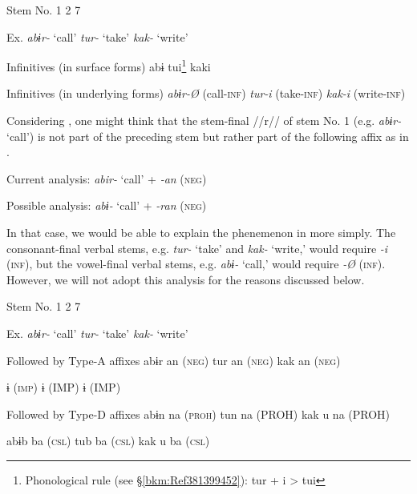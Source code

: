 \begin{table}
\caption{\label{tab:key:66}Infinitives of the verbal stems No. 1, 2, and 7}

Stem No.  1    2    7

Ex.  \textit{abɨr-} ‘call’    \textit{tur-} ‘take’    \textit{kak-} ‘write’

Infinitives (in surface forms)  abɨ      tui\footnote{Phonological rule (see §\ref{bkm:Ref381399452}): tur + i > tui}      kaki

Infinitives (in underlying forms)  \textit{abɨr-Ø}  (call-\textsc{inf})    \textit{tur-i}  (take-\textsc{inf})    \textit{kak-i}  (write-\textsc{inf})
\end{table}

Considering , one might think that the stem-final //r// of stem No. 1 (e.g. \textit{abɨr-} ‘call’) is not part of the preceding stem but rather part of the following affix as in .

\ea\label{ex:8-20}
  Current analysis:  \textit{abir-}  ‘call’  +  \textit{-an}  (\textsc{neg})

  Possible analysis:  \textit{abɨ-}  ‘call’  +  \textit{-ran}  (\textsc{neg})

In that case, we would be able to explain the phenemenon in  more simply. The consonant-final verbal stems, e.g. \textit{tur-} ‘take’ and \textit{kak-} ‘write,’ would require \textit{-i} (\textsc{inf}), but the vowel-final verbal stems, e.g. \textit{abɨ-} ‘call,’ would require \textit{-Ø} (\textsc{inf}). However, we will not adopt this analysis for the reasons discussed below.

\begin{table}
\caption{\label{tab:key:67}. Combinations of verbal roots and Type-A affixes and Type-D affixes}

Stem No.  1    2    7

Ex.  \textit{abɨr-} ‘call’    \textit{tur-} ‘take’    \textit{kak-} ‘write’

Followed by Type-A affixes  abɨr    an (\textsc{neg})    tur    an (\textsc{neg})    kak    an (\textsc{neg})

      ɨ (\textsc{imp})        ɨ (IMP)        ɨ (IMP)

Followed by Type-D affixes  abɨn    na (\textsc{proh})    tun    na (PROH)    kak  u  na (PROH)

  abɨb    ba (\textsc{csl})    tub    ba (\textsc{csl})    kak  u  ba (\textsc{csl})
\end{table}

